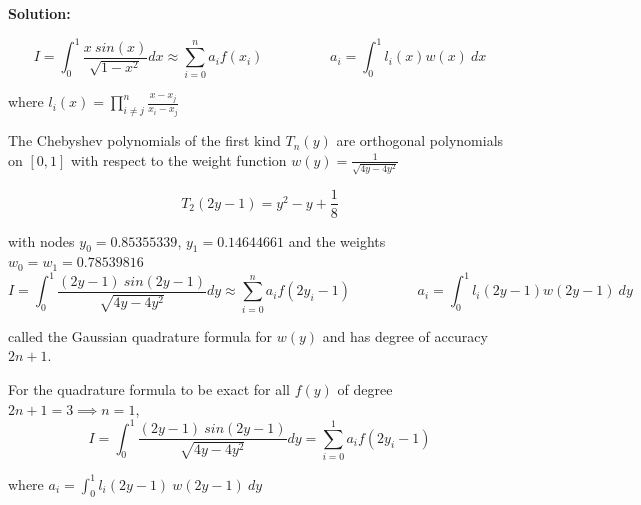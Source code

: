 \documentclass[a4paper,11pt]{report}
\begin{document}
\begin{enumerate}
\begin{itemize}
    \textbf{Solution:}

    \begin{equation*}
    I = \int_{0}^{1} \frac{x\ sin(x)}{\sqrt{1-x^2}} dx \approx \sum_{i=0}^{n} 
    a_{i} f(x_{i}) \hspace{2cm} a_{i} = \int_{0}^{1} l_{i}(x) w(x)\ dx
    \end{equation*}

    where $l_{i}(x) = \displaystyle \prod_{i \neq j}^{n} \frac{x - x_{j}}{x_{i}
    - x_{j}}$

    The Chebyshev polynomials of the first kind $T_{n}(y)$ are orthogonal 
    polynomials on $[0, 1]$ with respect to the weight function $w(y) = 
    \displaystyle \frac{1}{\sqrt{4y-4y^2}}$

    \begin{equation*}
    T_{2}(2y-1) = y^{2} - y + \frac{1}{8}
    \end{equation*}
    
    with nodes $y_{0} = 0.85355339$, $y_{1} = 0.14644661$ and the weights 
    $w_{0} = w_{1} = 0.78539816$
    \begin{equation*}
    I = \int_{0}^{1} \frac{(2y-1)\ sin(2y-1)}{\sqrt{4y-4y^2}} dy \approx 
    \sum_{i=0}^{n} a_{i} f(2y_{i} - 1) \hspace{2cm} a_{i} = \int_{0}^{1} 
    l_{i}(2y-1) w(2y-1)\ dy
    \end{equation*} 

    called the Gaussian quadrature formula for $w(y)$ and has degree of 
    accuracy $2n + 1$.
 
    For the quadrature formula to be exact for all $f(y)$ of degree $2n+1 = 3 
    \implies n = 1$,
    \begin{equation*}
    I = \int_{0}^{1} \frac{(2y-1)\ sin(2y-1)}{\sqrt{4y-4y^2}} dy = 
    \sum_{i=0}^{1} a_{i} f(2y_{i} - 1) 
    \end{equation*}

    where $a_{i} = \displaystyle \int_{0}^{1} l_{i}(2y-1)\ w(2y-1)\ dy$ 


\end{itemize}
\end{enumerate}
\end{document}
